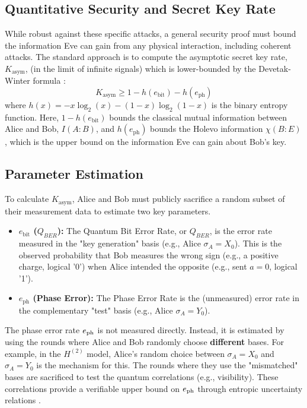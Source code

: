 \subsection{Quantitative Security and Secret Key Rate}
\label{sec:key_rate_formula}

While robust against these specific attacks, a general security proof must bound the information Eve can gain from any physical interaction, including coherent attacks. The standard approach \cite{Scarani2009} is to compute the asymptotic secret key rate, $K_{\text{asym}}$, (in the limit of infinite signals) which is lower-bounded by the Devetak-Winter formula \cite{Devetak2005}:
\begin{equation}
    K_{\text{asym}} \ge 1 - h(e_{\text{bit}}) - h(e_{\text{ph}})
\end{equation}
where $h(x) = -x \log_2(x) - (1-x) \log_2(1-x)$ is the binary entropy function. Here, $1 - h(e_{\text{bit}})$ bounds the classical mutual information between Alice and Bob, $I(A:B)$, and $h(e_{\text{ph}})$ bounds the Holevo information $\chi(B:E)$, which is the upper bound on the information Eve can gain about Bob's key.

\subsection{Parameter Estimation}
\label{sec:parameter_estimation}

To calculate $K_{\text{asym}}$, Alice and Bob must publicly sacrifice a random subset of their measurement data to estimate two key parameters.

\begin{itemize}
    \item \textbf{$e_{\text{bit}}$ ($Q_{BER}$):} The Quantum Bit Error Rate, or $Q_{BER}$, is the error rate measured in the "key generation" basis (e.g., Alice $\sigma_A=X_0$). This is the observed probability that Bob measures the wrong sign (e.g., a positive charge, logical '0') when Alice intended the opposite (e.g., sent $a=0$, logical '1').

    \item \textbf{$e_{\text{ph}}$ (Phase Error):} The Phase Error Rate is the (unmeasured) error rate in the complementary "test" basis (e.g., Alice $\sigma_A=Y_0$).
\end{itemize}

The phase error rate $e_{\rm ph}$ is not measured directly. Instead, it is estimated by using the rounds where Alice and Bob randomly choose \textbf{different} bases. For example, in the $H^{(2)}$ model, Alice's random choice between $\sigma_A=X_0$ and $\sigma_A=Y_0$ is the mechanism for this. The rounds where they use the "mismatched" bases are sacrificed to test the quantum correlations (e.g., visibility). These correlations provide a verifiable upper bound on $e_{\rm ph}$ through entropic uncertainty relations \cite{Tomamichel2011, Koashi2009}.

